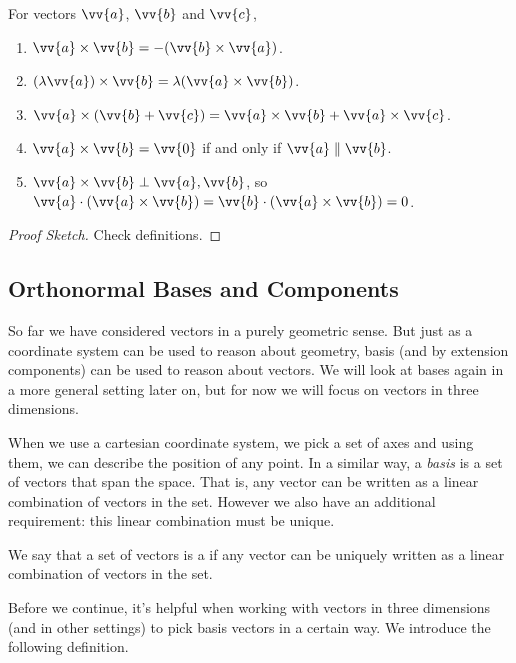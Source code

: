 \begin{proposition}
    For vectors $\vv{a}$, $\vv{b}$ and $\vv{c}$,
    \begin{enumerate}[label=(\roman*)]
        \item $\vv{a} \times \vv{b} = - (\vv{b} \times \vv{a})$.
        \item $(\lambda \vv{a}) \times \vv{b} = \lambda (\vv{a} \times \vv{b})$.
        \item $\vv{a} \times (\vv{b} + \vv{c}) = \vv{a} \times \vv{b} + \vv{a} \times \vv{c}$.
        \item $\vv{a} \times \vv{b} = \vv{0}$ if and only if $\vv{a} \parallel \vv{b}$.
        \item $\vv{a} \times \vv{b} \perp \vv{a}, \vv{b}$, so $\vv{a} \cdot (\vv{a} \times \vv{b}) = \vv{b} \cdot (\vv{a} \times \vv{b}) = 0$. 
    \end{enumerate}
\end{proposition}
\begin{proof}[Proof Sketch]
    Check definitions.
\end{proof}

\subsection{Orthonormal Bases and Components}

So far we have considered vectors in a purely geometric sense. But just as a coordinate system can be used to reason about geometry, basis (and by extension components) can be used to reason about vectors. We will look at bases again in a more general setting later on, but for now we will focus on vectors in three dimensions.

When we use a cartesian coordinate system, we pick a set of axes and using them, we can describe the position of any point. In a similar way, a \emph{basis} is a set of vectors that span the space. That is, any vector can be written as a linear combination of vectors in the set. However we also have an additional requirement: this linear combination must be unique.

\begin{definition}
    We say that a set of vectors is a  if any vector can be uniquely written as a linear combination of vectors in the set.
\end{definition}

Before we continue, it's helpful when working with vectors in three dimensions (and in other settings) to pick basis vectors in a certain way. We introduce the following definition.

